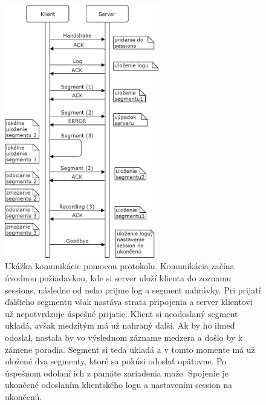 \begin{figure}[!hbt]
	\centering
	\includegraphics[width=0.6\textwidth]{obrazky-figures/protocol.png}
	\caption{Ukážka komunikácie pomocou protokolu. Komunikácia začína úvodnou požiadavkou, kde si server uloží klienta do zoznamu sessions, následne od neho prijme log a segment nahrávky. Pri prijatí ďalšieho segmentu však nastáva strata pripojenia a server klientovi už nepotvrdzuje úspešné prijatie. Klient si neodoslaný segment ukladá, avšak medzitým má už nahraný ďalší. Ak by ho ihneď odoslal, nastala by vo výslednom zázname medzera a došlo by k zámene poradia. Segment si teda ukladá a v tomto momente má už uložené dva segmenty, ktoré sa pokúsi odoslať opätovne. Po úspešnom odolaní ich z pamäte zariadenia maže. Spojenie je ukončené odoslaním klientského logu a nastavením session na ukončenú.}
	\label{protocol-example}
\end{figure}
\clearpage


